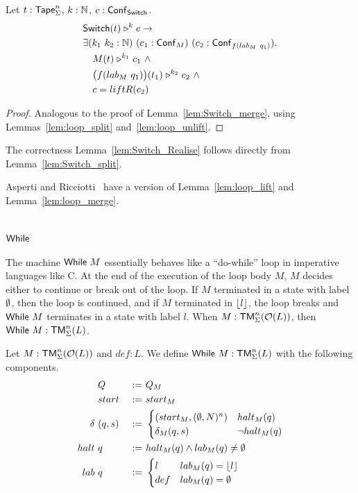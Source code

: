 \begin{lemma}
  \label{lem:Switch_split}
  Let $t : \mathsf{Tape}_\Sigma^n$, $k : \mathbb{N}$, $c : \mathsf{Conf}_{\mathsf{Switch}}$.
  \begin{align*}
    & \mathsf{Switch}(t) \mathrel{\triangleright}^k c \rightarrow \\
    & \exists (k_1~k_2 : \mathbb{N})~(c_1 : \mathsf{Conf}_M)~(c_2 : \mathsf{Conf}_{f(lab_M~q_1)}). \\
    & \quad M(t) \mathrel{\triangleright}^{k_1} c_1 ~\land~ \\
    & \quad \bigl( f (lab_M~q_1) \bigr) (t_1) \mathrel{\triangleright}^{k_2} c_2 ~\land~ \\
    & \quad c = liftR(c_2)
  \end{align*}
\end{lemma}
\begin{proof}
  Analogous to the proof of Lemma~\ref{lem:Switch_merge}, using Lemmas~\ref{lem:loop_split} and~\ref{lem:loop_unlift}.
\end{proof}
The correctness Lemma~\ref{lem:Switch_Realise} follows directly from Lemma~\ref{lem:Switch_split}.


Asperti and Ricciotti~\cite{asperti2015} have a version of Lemma~\ref{lem:loop_lift} and Lemma~\ref{lem:loop_merge}.

\section{$\mathsf{While}$}
\label{sec:While}
%

The machine $\mathsf{While}~M$ essentially behaves like a ``do-while'' loop in imperative languages like C.  At the end of the execution of the loop body $M$,
$M$ decides either to continue or break out of the loop.  If $M$ terminated in a state with label $\emptyset$, then the loop is continued, and if $M$
terminated in $\left\lfloor {l} \right\rfloor$, the loop breaks and $\mathsf{While}~M$ terminates in a state with label $l$.  When $M : \mathsf{TM}_\Sigma^n(\mathcal{O}(L))$, then
$\mathsf{While}~M : \mathsf{TM}_\Sigma^n(L)$.

\begin{definition}[$\MS{While}~M$][While]
  \label{def:While}
  Let $M : \mathsf{TM}_\Sigma^n(\mathcal{O}(L))$ and $def:L$.  We define $\mathsf{While}~M : \mathsf{TM}_\Sigma^n(L)$ with the following components.
  \begin{alignat*}{3}
    & Q              &~:=~& Q_M \\
    & start          &~:=~& start_M \\
    \delta ~& (q, s) &~:=~&
    \begin{cases}
      (start_M, (\emptyset, N)^n) & halt_M(q) \\
      \delta_M (q,s)    & \lnot halt_M(q)
    \end{cases} \\
    halt ~& q      &~:=~& halt_M(q) \land lab_M(q) \neq \emptyset \\
    lab ~& q      &~:=~&
    \begin{cases}
      l   & lab_M(q) = \left\lfloor {l} \right\rfloor \\
      def & lab_M(q) = \emptyset
    \end{cases}
  \end{alignat*}
\end{definition}

